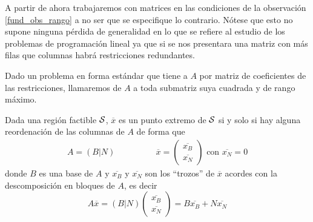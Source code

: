A partir de ahora trabajaremos con matrices en las condiciones de la observación \ref{fund_obs_rango} a no ser que se especifique lo contrario. Nótese que esto no supone ninguna pérdida de generalidad en lo que se refiere al estudio de los problemas de programación lineal ya que si se nos presentara una matriz con más filas que columnas habrá restricciones redundantes.
\begin{defi}[Bases]
	Dado un problema en forma estándar que tiene a $A$ por matriz de coeficientes de las restricciones, llamaremos  de $A$ a toda submatriz suya cuadrada y de rango máximo.
\end{defi}
\begin{theo}[Caracterización]
	\label{fund_teo_caracterizacionExtremos}
	Dada una región factible $\mathcal{S}$, $\overline{x}$ es un punto extremo de $\mathcal{S}$ si y solo si hay alguna reordenación de las columnas de $A$ de forma que
	\begin{equation*}
	\begin{array}{ccc}
	A=(B|N) \qquad&\qquad \overline{x}=\begin{pmatrix}
	\overline{x_B}\\
	\overline{x_N}
	\end{pmatrix}\text{ con } \overline{x_N}=0
	\end{array}
	\end{equation*}
	donde $B$ es una base de $A$ y $\overline{x_B}$ y $\overline{x_N}$ son los ``trozos'' de $\overline{x}$ acordes con la descomposición en bloques de $A$, es decir
	\begin{equation*}
		A\overline{x}=(B|N)\begin{pmatrix}
		\overline{x_B}\\
		\overline{x_N}
		\end{pmatrix}=B\overline{x_B}+N\overline{x_N}
	\end{equation*}
\end{theo}
